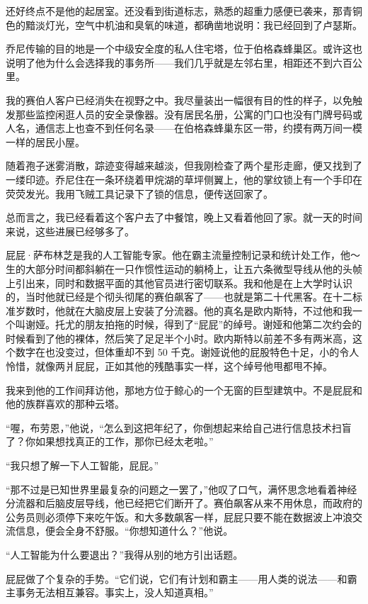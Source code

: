 \documentclass[AutoFakeBold=true]{book}
\begin{document}
还好终点不是他的起居室。还没看到街道标志，熟悉的超重力感便已袭来，那青铜色的黯淡灯光，空气中机油和臭氧的味道，都确凿地说明：我已经回到了卢瑟斯。

乔尼传输的目的地是一个中级安全度的私人住宅塔，位于伯格森蜂巢区。或许这也说明了他为什么会选择我的事务所——我们几乎就是左邻右里，相距还不到六百公里。

我的赛伯人客户已经消失在视野之中。我尽量装出一幅很有目的性的样子，以免触发那些监控闲逛人员的安全录像器。没有居民名册，公寓的门口也没有门牌号码或人名，通信志上也查不到任何名录——在伯格森蜂巢东区一带，约摸有两万间一模一样的居民小屋。

随着孢子迷雾消散，踪迹变得越来越淡，但我刚检查了两个星形走廊，便又找到了一缕印迹。乔尼住在一条环绕着甲烷湖的草坪侧翼上，他的掌纹锁上有一个手印在荧荧发光。我用飞贼工具记录下了锁的信息，便传送回家了。

总而言之，我已经看着这个客户去了中餐馆，晚上又看着他回了家。就一天的时间来说，这些进展已经够多了。

\vspace*{1em}

屁屁·萨布林芝是我的人工智能专家。他在霸主流量控制记录和统计处工作，他～生的大部分时间都斜躺在一只作惯性运动的躺椅上，让五六条微型导线从他的头帧上引出来，同时和数据平面的其他官员进行密切联系。我和他是在上大学时认识的，当时他就已经是个彻头彻尾的赛伯飙客了——也就是第二十代黑客。在十二标准岁数时，他就在大脑皮层上安装了分流器。他的真名是欧内斯特，不过他和我一个叫谢娅。托尤的朋友拍拖的时候，得到了``屁屁''的绰号。谢娅和他第二次约会的时候看到了他的裸体，然后笑了足足半个小时。欧内斯特以前差不多有两米高，这个数字在也没变过，但体重却不到 50 千克。谢娅说他的屁股特色十足，小的令人怜惜，就像两爿屁屁，正如其他的残酷事实一样，这个绰号他甩都甩不掉。

我来到他的工作间拜访他，那地方位于鲸心的一个无窗的巨型建筑中。不是屁屁和他的族群喜欢的那种云塔。

``喔，布劳恩，''他说，``怎么到这把年纪了，你倒想起来给自己进行信息技术扫盲了？你如果想找真正的工作，那你已经太老啦。''

``我只想了解一下人工智能，屁屁。''

``那不过是已知世界里最复杂的问题之一罢了，''他叹了口气，满怀思念地看着神经分流器和后脑皮层导线，他已经把它们断开了。赛伯飙客从来不用休息，而政府的公务员则必须停下来吃午饭。和大多数飙客一样，屁屁只要不能在数据波上冲浪交流信息，便会全身不舒服。``你想知道什么？''他说。

``人工智能为什么要退出？''我得从别的地方引出话题。

屁屁做了个复杂的手势。``它们说，它们有计划和霸主——用人类的说法——和霸主事务无法相互兼容。事实上，没人知道真相。''
\end{document}
